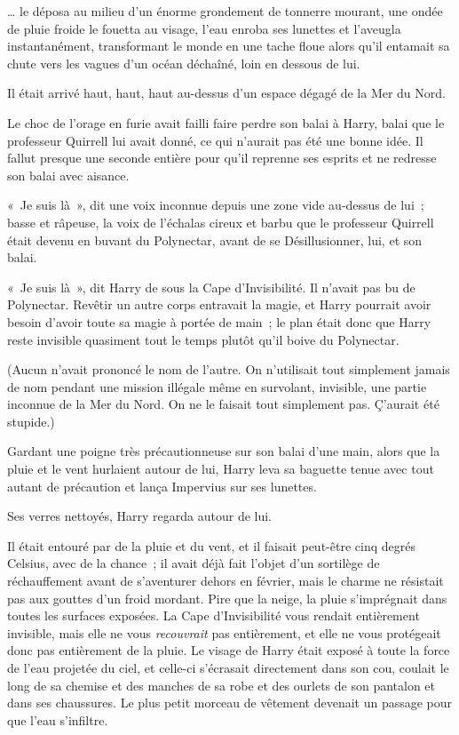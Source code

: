 … le déposa au milieu d'un énorme grondement de tonnerre mourant, une ondée de pluie froide le fouetta au visage, l'eau enroba ses lunettes et l'aveugla instantanément, transformant le monde en une tache floue alors qu'il entamait sa chute vers les vagues d'un océan déchaîné, loin en dessous de lui.

Il était arrivé haut, haut, haut au-dessus d'un espace dégagé de la Mer du Nord.

Le choc de l'orage en furie avait failli faire perdre son balai à Harry, balai que le professeur Quirrell lui avait donné, ce qui n'aurait pas été une bonne idée. Il fallut presque une seconde entière pour qu'il reprenne ses esprits et ne redresse son balai avec aisance.

«~Je suis là~», dit une voix inconnue depuis une zone vide au-dessus de lui~; basse et râpeuse, la voix de l'échalas cireux et barbu que le professeur Quirrell était devenu en buvant du Polynectar, avant de se Désillusionner, lui, et son balai.

«~Je suis là~», dit Harry de sous la Cape d'Invisibilité. Il n'avait pas bu de Polynectar. Revêtir un autre corps entravait la magie, et Harry pourrait avoir besoin d'avoir toute sa magie à portée de main~; le plan était donc que Harry reste invisible quasiment tout le temps plutôt qu'il boive du Polynectar.

(Aucun n'avait prononcé le nom de l'autre. On n'utilisait tout simplement jamais de nom pendant une mission illégale même en survolant, invisible, une partie inconnue de la Mer du Nord. On ne le faisait tout simplement pas. Ç'aurait été stupide.)

Gardant une poigne très précautionneuse sur son balai d'une main, alors que la pluie et le vent hurlaient autour de lui, Harry leva sa baguette tenue avec tout autant de précaution et lança Impervius sur ses lunettes.

Ses verres nettoyés, Harry regarda autour de lui.

Il était entouré par de la pluie et du vent, et il faisait peut-être cinq degrés Celsius, avec de la chance~; il avait déjà fait l'objet d'un sortilège de réchauffement avant de s'aventurer dehors en février, mais le charme ne résistait pas aux gouttes d'un froid mordant. Pire que la neige, la pluie s'imprégnait dans toutes les surfaces exposées. La Cape d'Invisibilité vous rendait entièrement invisible, mais elle ne vous \emph{recouvrait} pas entièrement, et elle ne vous protégeait donc pas entièrement de la pluie. Le visage de Harry était exposé à toute la force de l'eau projetée du ciel, et celle-ci s'écrasait directement dans son cou, coulait le long de sa chemise et des manches de sa robe et des ourlets de son pantalon et dans ses chaussures. Le plus petit morceau de vêtement devenait un passage pour que l'eau s'infiltre.

